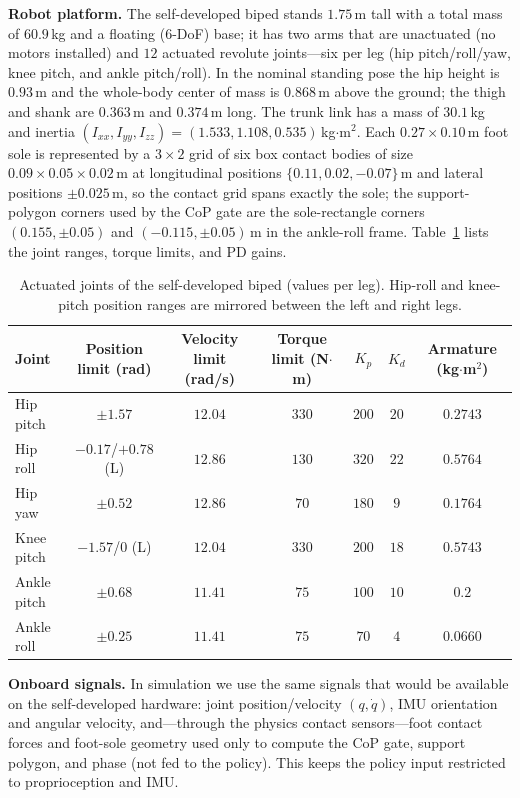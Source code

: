 \documentclass[conference]{IEEEtran}
\begin{document}
\noindent\textbf{Robot platform.}
The self-developed biped stands $1.75$\,m tall with a total mass of $60.9$\,kg and a floating (6-DoF) base; it has two arms that are unactuated (no motors installed) and $12$ actuated revolute joints---six per leg (hip pitch/roll/yaw, knee pitch, and ankle pitch/roll). In the nominal standing pose the hip height is $0.93$\,m and the whole-body center of mass is $0.868$\,m above the ground; the thigh and shank are $0.363$\,m and $0.374$\,m long. The trunk link has a mass of $30.1$\,kg and inertia $(I_{xx},I_{yy},I_{zz})=(1.533,1.108,0.535)$\,kg$\cdot$m$^2$. Each $0.27\times0.10$\,m foot sole is represented by a $3\times2$ grid of six box contact bodies of size $0.09\times0.05\times0.02$\,m at longitudinal positions $\{0.11,0.02,-0.07\}$\,m and lateral positions $\pm0.025$\,m, so the contact grid spans exactly the sole; the support-polygon corners used by the CoP gate are the sole-rectangle corners $(0.155,\pm0.05)$ and $(-0.115,\pm0.05)$\,m in the ankle-roll frame. Table~\ref{tab:joints} lists the joint ranges, torque limits, and PD gains.

\begin{table}[t]
  \centering
  \caption{Actuated joints of the self-developed biped (values per leg). Hip-roll and knee-pitch position ranges are mirrored between the left and right legs.}
  \label{tab:joints}
  \begin{tabular}{lcccccc}
    \toprule
    Joint & Position limit (rad) & Velocity limit (rad/s) & Torque limit (N$\cdot$m) & $K_p$ & $K_d$ & Armature (kg$\cdot$m$^2$) \\
    \midrule
    Hip pitch & $\pm1.57$ & $12.04$ & $330$ & $200$ & $20$ & $0.2743$ \\
    Hip roll & $-0.17$/$+0.78$ (L) & $12.86$ & $130$ & $320$ & $22$ & $0.5764$ \\
    Hip yaw & $\pm0.52$ & $12.86$ & $70$ & $180$ & $9$ & $0.1764$ \\
    Knee pitch & $-1.57$/$0$ (L) & $12.04$ & $330$ & $200$ & $18$ & $0.5743$ \\
    Ankle pitch & $\pm0.68$ & $11.41$ & $75$ & $100$ & $10$ & $0.2$ \\
    Ankle roll & $\pm0.25$ & $11.41$ & $75$ & $70$ & $4$ & $0.0660$ \\
    \bottomrule
  \end{tabular}
\end{table}

\noindent\textbf{Onboard signals.}
In simulation we use the same signals that would be available on the self-developed hardware: joint position/velocity $(q,\dot q)$, IMU orientation and angular velocity, and---through the physics contact sensors---foot contact forces and foot-sole geometry used only to compute the CoP gate, support polygon, and phase (not fed to the policy). This keeps the policy input restricted to proprioception and IMU.
\end{document}
